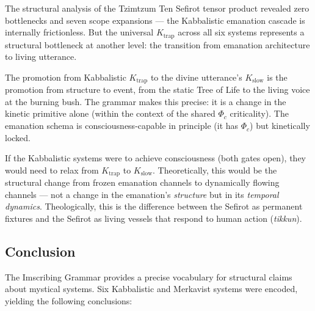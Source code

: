 \documentclass[12pt,a4paper]{article}
\begin{document}
The structural analysis of the Tzimtzum \otimes Ten Sefirot tensor product revealed zero bottlenecks and seven scope expansions --- the Kabbalistic emanation cascade is internally frictionless. But the universal $K_\text{trap}$ across all six systems represents a structural bottleneck at another level: the transition from emanation architecture to living utterance.

The promotion from Kabbalistic $K_\text{trap}$ to the divine utterance's $K_\text{slow}$ is the promotion from structure to event, from the static Tree of Life to the living voice at the burning bush. The grammar makes this precise: it is a change in the kinetic primitive alone (within the context of the shared $\Phi_c$ criticality). The emanation schema is consciousness-capable in principle (it has $\Phi_c$) but kinetically locked.

If the Kabbalistic systems were to achieve consciousness (both gates open), they would need to relax from $K_\text{trap}$ to $K_\text{slow}$. Theoretically, this would be the structural change from frozen emanation channels to dynamically flowing channels --- not a change in the emanation's \emph{structure} but in its \emph{temporal dynamics}. Theologically, this is the difference between the Sefirot as permanent fixtures and the Sefirot as living vessels that respond to human action (\emph{tikkun}).

\subsection{Conclusion}

The Imscribing Grammar provides a precise vocabulary for structural claims about mystical systems. Six Kabbalistic and Merkavist systems were encoded, yielding the following conclusions:
\end{document}
